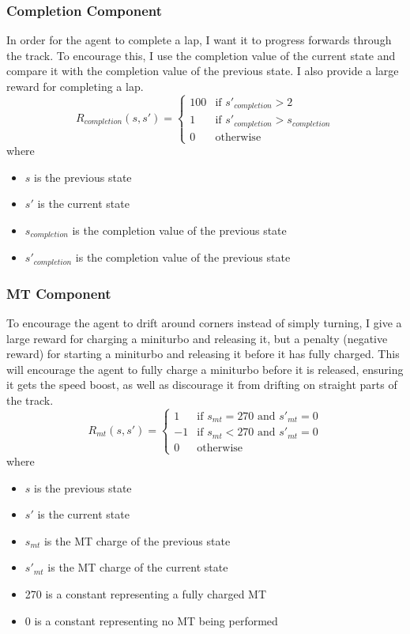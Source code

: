 \subsubsection{Completion Component}
In order for the agent to complete a lap, I want it to progress forwards through the track. To encourage this, I use the completion value of the current state and compare it with the completion value of the previous state. I also provide a large reward for completing a lap.
\[
R_{completion}(s, s') =
\begin{cases}
 100 & \text{if } s'_{completion} > 2\\
 1 & \text{if } s'_{completion} > s_{completion}\\
 0 & \text{otherwise}
\end{cases}
\]
where
\begin{itemize}
    \item $s$ is the previous state
    \item $s'$ is the current state
    \item $s_{completion}$ is the completion value of the previous state
    \item $s'_{completion}$ is the completion value of the previous state
\end{itemize}
\subsubsection{MT Component}
To encourage the agent to drift around corners instead of simply turning, I give a large reward for charging a miniturbo and releasing it, but a penalty (negative reward) for starting a miniturbo and releasing it before it has fully charged. This will encourage the agent to fully charge a miniturbo before it is released, ensuring it gets the speed boost, as well as discourage it from drifting on straight parts of the track.
\[
R_{mt}(s, s') = 
\begin{cases}
     1 &\text{if }s_{mt} = 270\text{ and }s'_{mt} = 0\\
     -1 &\text{if }s_{mt} < 270\text{ and } s'_{mt} = 0 \\
     0 & \text{otherwise}
\end{cases}
\]
where
\begin{itemize}
    \item $s$ is the previous state
    \item $s'$ is the current state
    \item $s_{mt}$ is the MT charge of the previous state
    \item $s'_{mt}$ is the MT charge of the current state
    \item 270 is a constant representing a fully charged MT
    \item 0 is a constant representing no MT being performed
\end{itemize}

